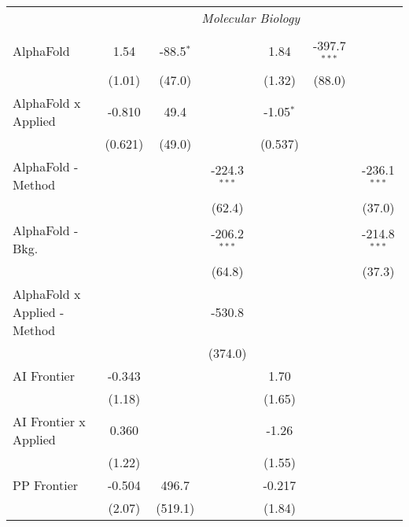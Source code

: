 \begin{tabular}{lcccccc}
 & \multicolumn{6}{c}{\textit{Molecular Biology}} \\ \\
   AlphaFold                    & 1.54    & -88.5$^{*}$   &                  & 1.84         & -397.7$^{***}$ &   \\   
                                & (1.01)  & (47.0)        &                  & (1.32)       & (88.0)         &   \\   
   AlphaFold x Applied          & -0.810  & 49.4          &                  & -1.05$^{*}$  &                &   \\   
                                & (0.621) & (49.0)        &                  & (0.537)      &                &   \\   
   AlphaFold - Method           &         &               & -224.3$^{***}$   &              &                & -236.1$^{***}$\\   
                                &         &               & (62.4)           &              &                & (37.0)\\   
   AlphaFold - Bkg.             &         &               & -206.2$^{***}$   &              &                & -214.8$^{***}$\\   
                                &         &               & (64.8)           &              &                & (37.3)\\   
   AlphaFold x Applied - Method &         &               & -530.8           &              &                &   \\   
                                &         &               & (374.0)          &              &                &   \\   
   AI Frontier                  & -0.343  &               &                  & 1.70         &                &   \\   
                                & (1.18)  &               &                  & (1.65)       &                &   \\   
   AI Frontier x Applied        & 0.360   &               &                  & -1.26        &                &   \\   
                                & (1.22)  &               &                  & (1.55)       &                &   \\   
   PP Frontier                  & -0.504  & 496.7         &                  & -0.217       &                &   \\   
                                & (2.07)  & (519.1)       &                  & (1.84)       &                &   \\   

\end{tabular}

